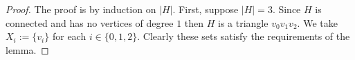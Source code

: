 \documentclass[12pt]{article}
\theoremstyle{definition}
\begin{document}
\begin{proof}
  The proof is by induction on $|H|$.  First, suppose $|H|=3$. Since $H$ is connected and has no vertices of degree $1$ then $H$ is a triangle $v_0v_1v_2$. We take $X_i:=\{v_i\}$ for each $i\in\{0,1,2\}$.  Clearly these sets satisfy the requirements of the lemma.



\end{proof}
\end{document}
